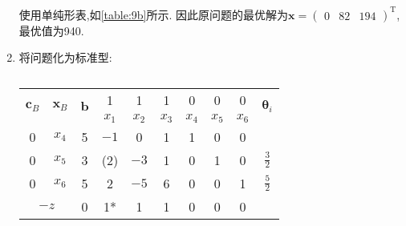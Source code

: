 \begin{enumerate}[label=\alph*)]
\begin{table}[ht]
\begin{tabular}{|c|c|c|c|c|c|c|c|c|}
                \hline
            \end{tabular}
        \end{table}
        使用单纯形表,如\cref{table:9b}所示.
        因此原问题的最优解为$\bm{x}=\begin{pmatrix}0 & 82 & 194\end{pmatrix}^\mathrm{T}$, 最优值为940.

    \item
        将问题化为标准型:

        \begin{table}[ht]
            \centering
            \caption{}
            \label{table:9c}
            \begin{tabular}{|c|c|c|c|c|c|c|c|c|c|}
                \hline
                \multirow{2}{*}{$\bm{c}_B$} & \multirow{2}{*}{$\bm{x}_B$} & \multirow{2}{*}{$\bm{b}$} & \multicolumn{1}{c}{1} & \multicolumn{1}{c}{1} & \multicolumn{1}{c}{1} & \multicolumn{1}{c}{0} & \multicolumn{1}{c}{0} & 0 & \multirow{2}{*}{$\bm{\theta}_i$} \\
                \cline{4-9}
                &&& \multicolumn{1}{c}{$x_1$} & \multicolumn{1}{c}{$x_2$} & \multicolumn{1}{c}{$x_3$} & \multicolumn{1}{c}{$x_4$} & \multicolumn{1}{c}{$x_5$} & $x_6$ & \\
                \hline
                0 & $x_4$ & 5 & \multicolumn{1}{c}{\cellcolor{LightBlue1}$-1$} & \multicolumn{1}{c}{0} & \multicolumn{1}{c}{1} & \multicolumn{1}{c}{1} & \multicolumn{1}{c}{0} & 0 & \\
                \cline{1-3}
                0 & {\color{red}$x_5$} & 3 & \multicolumn{1}{c}{\cellcolor{LightBlue1}\color{red}(2)} & \multicolumn{1}{c}{$-3$} & \multicolumn{1}{c}{1} & \multicolumn{1}{c}{0} & \multicolumn{1}{c}{1} & 0 & {\color{red}$\tfrac{3}{2}$} \\
                \cline{1-3}
                0 & $x_6$ & 5 & \multicolumn{1}{c}{\cellcolor{LightBlue1}2} & \multicolumn{1}{c}{$-5$} & \multicolumn{1}{c}{6} & \multicolumn{1}{c}{0} & \multicolumn{1}{c}{0} & 1 & $\tfrac{5}{2}$ \\
                \hline
                \multicolumn{2}{|c|}{$-z$} & 0 & \multicolumn{1}{c}{\cellcolor{LightBlue1}\color{red}1*} & \multicolumn{1}{c}{1} & \multicolumn{1}{c}{1} & \multicolumn{1}{c}{0} & \multicolumn{1}{c}{0} & 0 & \\


\end{tabular}
\end{table}
\end{enumerate}
